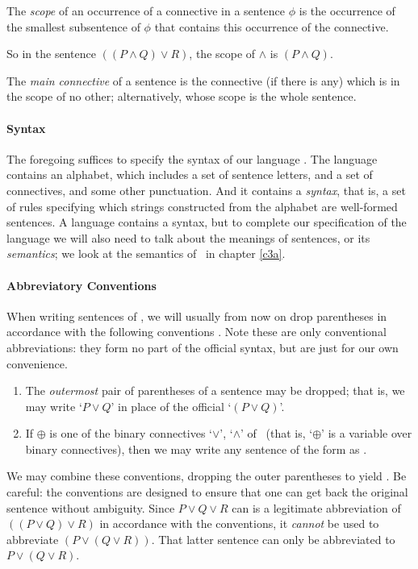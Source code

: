 \begin{definition}[Scope]
		The \emph{scope} of an occurrence of a connective in a sentence $\phi$ is the occurrence of the smallest subsentence of $\phi$ that contains this occurrence of the connective.
\end{definition}
So in the sentence $((P\wedge Q) \vee R)$, the scope of $\wedge$ is $(P \wedge Q)$. 

\begin{definition}
	The \emph{main connective} of a sentence is the connective (if there is any) which is in the scope of no other; alternatively, whose scope is the whole sentence.
\end{definition}



\paragraph{Syntax} The foregoing suffices to specify the syntax of our language \lone. The language contains an alphabet, which includes a set of sentence letters, and a set of connectives, and some other punctuation. And it contains a \emph{syntax}, that is, a set of rules specifying which strings constructed from the alphabet are well-formed sentences. A language contains a syntax, but to complete our specification of the language we will also need to talk about the meanings of sentences, or its \emph{semantics}; we look at the semantics of \lone\ in chapter \ref{c3a}.

\paragraph{Abbreviatory Conventions} When writing sentences of \lone, we will usually from now on drop parentheses in accordance with the following conventions \citep[\S2.3]{hallogma}. Note these are only conventional abbreviations: they form no part of the official syntax, but are just for our own convenience. \begin{enumerate}
	\item The \emph{outermost} pair of parentheses of a sentence may be dropped; that is, we may write `$P \vee Q$' in place of the official `$(P \vee Q)$'.
	\item If $\oplus$ is one of the binary connectives `$\vee$', `$\wedge$' of \lone\ (that is, `$\oplus$' is a variable over binary connectives), then we may write any sentence of the form \cquote{((\phi \oplus \psi)\oplus \chi)} as \cquote{(\phi\oplus\psi\oplus\chi)}.
\end{enumerate}
We may combine these conventions, dropping the outer parentheses to yield \cquote{\phi\oplus\psi\oplus\chi}. Be careful: the conventions are designed to ensure that one can get back the original sentence without ambiguity. Since $P \vee Q \vee R$ can is a legitimate abbreviation of $((P \vee Q) \vee R)$ in accordance with the conventions, it \emph{cannot} be used to abbreviate $(P \vee (Q \vee R))$. That latter sentence can only be abbreviated to $P \vee (Q \vee R)$. 



